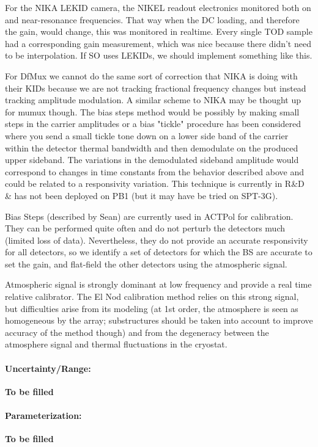 For the NIKA LEKID camera, the NIKEL readout electronics monitored both on and near-resonance frequencies. That way when the DC loading, and therefore the gain, would change, this was monitored in realtime. Every single TOD sample had a corresponding gain measurement, which was nice because there didn't need to be interpolation. If SO uses LEKIDs, we should implement something like this. 

For DfMux we cannot do the same sort of correction that NIKA is doing with their KIDs because we are not tracking fractional frequency changes but instead tracking amplitude modulation. A similar scheme to NIKA may be thought up for mumux though. The bias steps method would be possibly by making small steps in the carrier amplitudes or a bias "tickle" procedure has been considered where you send a small tickle tone down on a lower side band of the carrier within the detector thermal bandwidth and then demodulate on the produced upper sideband. The variations in the demodulated sideband amplitude would correspond to changes in time constants from the behavior described above and could be related to a responsivity variation. This technique is currently in R\&D \& has not been deployed on PB1 (but it may have be tried on SPT-3G).

Bias Steps (described by Sean) are currently used in ACTPol for calibration. They can be performed quite often and do not perturb the detectors much (limited loss of data). Nevertheless, they do not provide an accurate responsivity for all detectors, so we identify a set of detectors for which the BS are accurate to set the gain, and flat-field the other detectors using the atmospheric signal.

Atmospheric signal is strongly dominant at low frequency and provide a real time relative calibrator. The El Nod calibration method relies on this strong signal, but difficulties arise from its modeling (at 1st order, the atmosphere is seen as homogeneous by the array; substructures should be taken into account to improve accuracy of the method though) and from the degeneracy between the atmosphere signal and thermal fluctuations in the cryostat.


\paragraph{Uncertainty/Range:}
\textbf{To be filled}
\paragraph{Parameterization:}
\textbf{To be filled}



